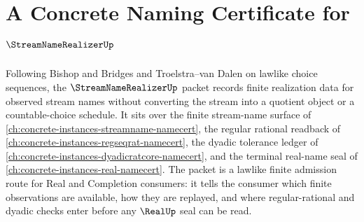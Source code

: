 \chapter{A Concrete Naming Certificate for $\StreamNameRealizerUp$}
\label{ch:concrete-instances-streamname-realizer-namecert}

Following Bishop and Bridges and Troelstra--van Dalen on lawlike choice sequences, the $\StreamNameRealizerUp$ packet records finite realization data for observed stream names without converting the stream into a quotient object or a countable-choice schedule. It sits over the finite stream-name surface of \autoref{ch:concrete-instances-streamname-namecert}, the regular rational readback of \autoref{ch:concrete-instances-regseqrat-namecert}, the dyadic tolerance ledger of \autoref{ch:concrete-instances-dyadicratcore-namecert}, and the terminal real-name seal of \autoref{ch:concrete-instances-real-namecert}. The packet is a lawlike finite admission route for Real and Completion consumers: it tells the consumer which finite observations are available, how they are replayed, and where regular-rational and dyadic checks enter before any $\RealUp$ seal can be read.

